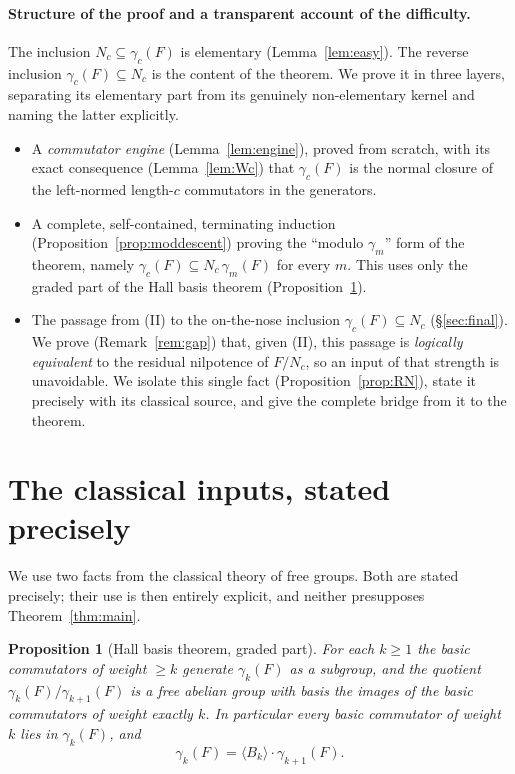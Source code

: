 \documentclass{amsart}
\newtheorem{proposition}{Proposition}
\theoremstyle{definition}
\theoremstyle{remark}
\begin{document}
\paragraph{Structure of the proof and a transparent account of the difficulty.}
The inclusion $N_c\subseteq\gamma_c(F)$ is elementary (Lemma~\ref{lem:easy}). The
reverse inclusion $\gamma_c(F)\subseteq N_c$ is the content of the theorem. We
prove it in three layers, separating its elementary part from its genuinely
non-elementary kernel and naming the latter explicitly.
\begin{itemize}
\item[(I)] A \emph{commutator engine} (Lemma~\ref{lem:engine}), proved from
scratch, with its exact consequence (Lemma~\ref{lem:Wc}) that $\gamma_c(F)$ is the
normal closure of the left-normed length-$c$ commutators in the generators.
\item[(II)] A complete, self-contained, terminating induction
(Proposition~\ref{prop:moddescent}) proving the ``modulo $\gamma_m$'' form of the
theorem, namely $\gamma_c(F)\subseteq N_c\,\gamma_m(F)$ for every $m$. This uses
only the graded part of the Hall basis theorem (Proposition~\ref{prop:hall}).
\item[(III)] The passage from (II) to the on-the-nose inclusion
$\gamma_c(F)\subseteq N_c$ (\S\ref{sec:final}). We prove
(Remark~\ref{rem:gap}) that, given (II), this passage is \emph{logically
equivalent} to the residual nilpotence of $F/N_c$, so an input of that strength is
unavoidable. We isolate this single fact (Proposition~\ref{prop:RN}), state it
precisely with its classical source, and give the complete bridge from it to the
theorem.
\end{itemize}

\section{The classical inputs, stated precisely}\label{sec:input}

We use two facts from the classical theory of free groups. Both are stated
precisely; their use is then entirely explicit, and neither presupposes
Theorem~\ref{thm:main}.

\begin{proposition}[Hall basis theorem, graded part]\label{prop:hall}
For each $k\ge 1$ the basic commutators of weight $\ge k$ generate $\gamma_k(F)$
as a subgroup, and the quotient $\gamma_k(F)/\gamma_{k+1}(F)$ is a free abelian
group with basis the images of the basic commutators of weight exactly $k$. In
particular every basic commutator of weight $k$ lies in $\gamma_k(F)$, and
\begin{equation}\label{eq:hall-decomp}
\gamma_k(F)=\langle B_k\rangle\cdot\gamma_{k+1}(F).
\end{equation}
\end{proposition}
\end{document}
